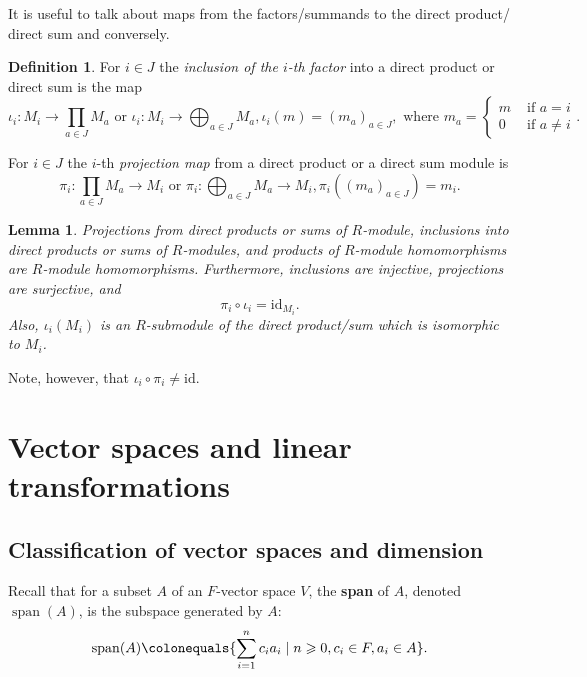\documentclass[12pt]{report}
\newtheorem{lemma}[theorem]{Lemma}
\numberwithin{equation}{section}
\numberwithin{theorem}{chapter}
\theoremstyle{definition}
\newtheorem{definition}[theorem]{Definition}
\newtheorem*{basic properties}{Basic Properties}
\newtheorem*{Important Remark}{Important Remark}
\newcommand{\df}[1]{{\bf #1}\index{#1}}
\DeclareMathOperator{\Span}{span}
\begin{document}
It is useful to talk about maps from the factors/summands to the direct product/ direct sum and conversely.

\begin{definition}
For $i\in J$ the {\em inclusion of the $i$-th factor} into a direct product or direct sum is the map
$$\iota_i\!: M_i \to \prod_{a \in J} M_a \text{ or } \iota_i\!: M_i \to \bigoplus_{a \in J} M_a, \iota_i(m)=(m_a)_{a \in J}, \text{ where } m_a=\begin{cases} m & \text{ if } a = i \\ 0 & \text{ if } a \neq i \end{cases}.$$


\noindent For $i\in J$ the $i$-th {\em projection map} from a direct product or a direct sum module is 
$$\pi_i\!: \prod_{a \in J} M_a \to M_i \text{ or } \pi_i:\bigoplus_{a \in J} M_a \to M_i, \pi_i \left((m_a)_{a \in J}\right)=m_i.$$
\end{definition}


\begin{lemma}
Projections from direct products or sums of $R$-module, inclusions into direct products or sums of $R$-modules, and products of $R$-module homomorphisms are $R$-module homomorphisms. Furthermore, inclusions are injective, projections are surjective, and 
$$\pi_i\circ \iota_i=\mathrm{id}_{M_i}.$$
Also, $\iota_i(M_i)$ is an $R$-submodule of the direct product/sum which is isomorphic to $M_i$.
\end{lemma}


Note, however, that $\iota_i\circ\pi_i\neq \mathrm{id}$.





\chapter{Vector spaces and linear transformations}

\section{Classification of vector spaces and dimension}


Recall that for a subset $A$ of an $F$-vector space $V$, the \df{span} of $A$, denoted $\Span(A)$, is the subspace generated by $A$:
$$\Span(A) \colonequals \{\sum_{i=1}^n c_ia_i \mid n \geqslant 0, c_i\in F, a_i \in A \}.$$

\end{document}
